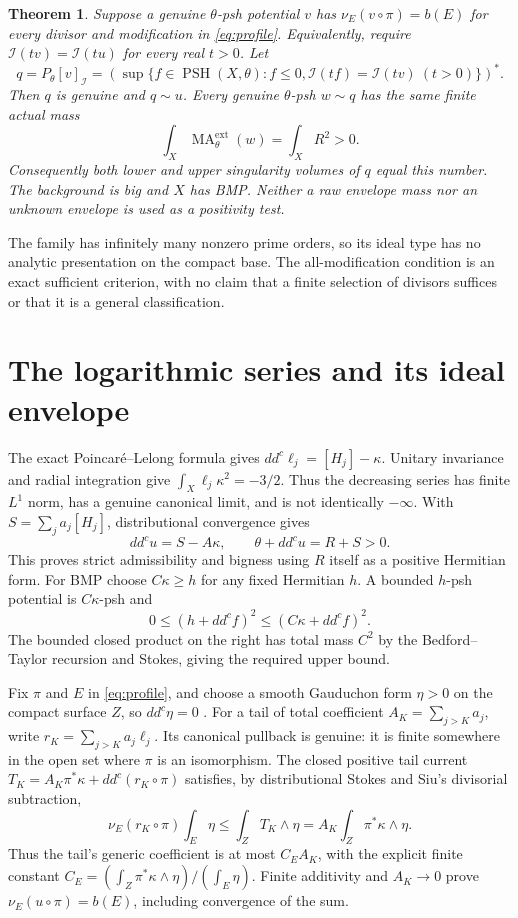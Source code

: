 \documentclass[11pt]{article}
\newcommand{\ddc}{dd^c}
\newtheorem{theorem}{Theorem}
\theoremstyle{remark}\newtheorem{remark}[theorem]{Remark}
\begin{document}
\begin{theorem}\label{th:criterion}
Suppose a genuine $\theta$-psh potential $v$ has
$\nu_E(v\circ\pi)=b(E)$ for every divisor and modification in
\eqref{eq:profile}. Equivalently, require
$\mathcal I(tv)=\mathcal I(tu)$ for every real $t>0$.
Let
\[
 q=P_\theta[v]_{\mathcal I}
 =\left(\sup\{f\in\operatorname{PSH}(X,\theta):f\leq0,
             \mathcal I(tf)=\mathcal I(tv)\ (t>0)\}\right)^*.
\]
Then $q$ is genuine and $q\sim u$. Every genuine $\theta$-psh
$w\sim q$ has the same finite actual mass
\begin{equation}\label{eq:mass}
 \int_X\operatorname{MA}^{\mathrm{ext}}_\theta(w)=\int_XR^2>0.
\end{equation}
Consequently both lower and upper singularity volumes of $q$ equal
this number. The background is big and $X$ has BMP. Neither a raw
envelope mass nor an unknown envelope is used as a positivity test.
\end{theorem}

The family has infinitely many nonzero prime orders, so its ideal type
has no analytic presentation on the compact base. The all-modification
condition is an exact sufficient criterion, with no claim that a finite
selection of divisors suffices or that it is a general classification.

\section{The logarithmic series and its ideal envelope}
The exact Poincar\'e--Lelong formula gives
$\ddc\ell_j=[H_j]-\kappa$. Unitary invariance and radial integration
give $\int_X\ell_j\kappa^2=-3/2$. Thus the decreasing series has finite
$L^1$ norm, has a genuine canonical limit, and is not identically
$-\infty$. With $S=\sum_ja_j[H_j]$, distributional convergence gives
\[
 \ddc u=S-A\kappa,\qquad \theta+\ddc u=R+S>0.
\]
This proves strict admissibility and bigness using $R$ itself as a
positive Hermitian form. For BMP choose $C\kappa\geq h$ for any fixed
Hermitian $h$. A bounded $h$-psh potential is $C\kappa$-psh and
\[
 0\leq(h+\ddc f)^2\leq(C\kappa+\ddc f)^2.
\]
The bounded closed product on the right has total mass $C^2$ by
the Bedford--Taylor recursion and Stokes, giving the required upper bound.

Fix $\pi$ and $E$ in \eqref{eq:profile}, and choose a smooth
Gauduchon form $\eta>0$ on the compact surface $Z$, so
$\ddc\eta=0$ \cite[Theorem 2]{Gau}. For a tail of total coefficient
$A_K=\sum_{j>K}a_j$, write $r_K=\sum_{j>K}a_j\ell_j$.
Its canonical pullback is genuine: it is finite somewhere in the open
set where $\pi$ is an isomorphism. The closed positive tail current
$T_K=A_K\pi^*\kappa+\ddc(r_K\circ\pi)$ satisfies, by distributional
Stokes and Siu's divisorial subtraction,
\[
 \nu_E(r_K\circ\pi)\int_E\eta
 \leq\int_Z T_K\wedge\eta
 =A_K\int_Z\pi^*\kappa\wedge\eta.
\]
Thus the tail's generic coefficient is at most $C_EA_K$, with the
explicit finite constant $C_E=(\int_Z\pi^*\kappa\wedge\eta)/(\int_E\eta)$.
Finite additivity and $A_K\to0$ prove
$\nu_E(u\circ\pi)=b(E)$, including convergence of the sum.
\end{document}
